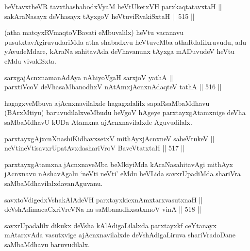 
\begin{shl}
heVtavxtheVR tavxthashabodxV\s yaM heVtUketxVH parxkaqtatavxtaH || \\
sakAraNasayx deVhasayx tAyxgoV heVtuviRvakiSxtaH \hfill || 515 ||  
\end{shl}

\begin{artha}
(atha matoyxRV\s maqtoVBavati eMbuvalilx) heVtu vacanavu
pusutxtavAgiruvudariMda atha shabadxvu heVtuveMba athaRdalilxruvudu,
adu yAvudeMdare, kAraNa sahitavAda deVhavanunx tAyxga mADuvudeV heVtu
eMdu vivakiSxta.
\end{artha}

\begin{shl}
sarxgajAcnxnamanAdAya nAhiyoVgaH sarxjoV yathA || \\
parxtiVcoV deVhasaMbanodhxV nA\s \s tAmxjAcnxnAdaqteV tathA \hfill || 516 ||  
\end{shl}

\begin{artha}
hagagxveMbuva ajAcnxnavilalxde hagagxdalilx sapaRsaMbaMdhavu
(BArxMtiyu) baruvudilalxveMbudu heVgoV hAgeye parxtayxgAtamxnige deVha
saMbaMdhavU kUDa Atamxna ajAcnxnavilalxde Aguvudilalx.
\end{artha}

\begin{shl}
parxtayxgAjxcnXnashiKidhavxsetxV mithAyxjAcnxneV saheVtukeV || \\
neVtineVtisavxrUpatAvxdashariVroV BaveVtatxtaH \hfill || 517 ||  
\end{shl}

\begin{artha}
parxtayxgAtamxna jAcnxnaveMba beMkiyiMda kAraNasahitavAgi mithAyx
jAcnxnavu nAshavAgalu `neVti neVti' eMdu heVLida savxrUpadiMda
shariVra saMbaMdhavilalxdavanAguvanu.
\end{artha}

\begin{shl}
savxtoV\s digedxVshakAlAdeVH parxtayxkicxnAmxtarxvasutxnaH || \\
deVshAdimacaCxriVreVNa na saMbanadhxsatxmoV vinA \hfill || 518 ||  
\end{shl}

\begin{artha}
savxrUpadalilx dikukx deVsha kAlAdigaLilalxda parxtayxkf ceYtanayx
mAtarxvAda vasutxvige ajAcnxnavilalxde deVshAdigaLiruva shariVradoDane
saMbaMdhavu baruvudilalx.
\end{artha}

